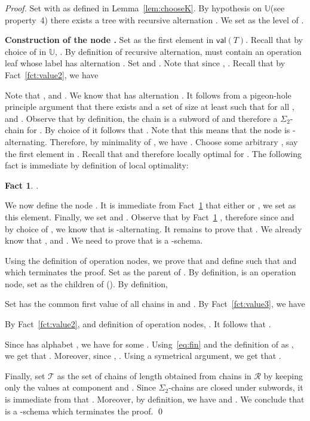 \documentclass[envcountsame]{llncs}
\newcommand\Ts{\ensuremath{\mathcal{T}}\xspace}
\newcommand\Rs{\ensuremath{\mathcal{R}}\xspace}
\newcommand\crr{\ensuremath{\mathbb{U}}\xspace}
\newcommand{\sic}[1]{\ensuremath{\Sigma_{#1}}\xspace}
\newcommand\val[1]{\ensuremath{\textsf{val}(#1)\xspace}}
\newcommand\chain{chain\xspace}
\newcommand\qchain[1]{\ensuremath{\sic{#1}}-chain\xspace}
\newcommand\chains{chains\xspace}
\newcommand\qchains[1]{\ensuremath{\sic{#1}}-chains\xspace}
\newcommand\dchain{\qchain{2}}
\newcommand\dchains{\qchains{2}}
\newtheorem{fact}[theorem]{Fact}
\begin{document}
\begin{proof}
  Set  with  as defined in
  Lemma~\ref{lem:chooseK}. By hypothesis on \crr (see property~4) there
  exists a tree   with recursive alternation . We set 
  as the level of .

  \medskip
  \noindent
  {\bf Construction of the node .} Set  as the first
  element in \val{T}. Recall that by choice of  in \crr, . 
  By definition of recursive alternation,  must contain an operation
  leaf  whose label  has alternation
  . Set  and . Note that since , . Recall that by Fact~\ref{fct:value2}, we have 
  
  Note that ,  and . We know that
   has alternation . It follows
  from a pigeon-hole principle argument that there exists  and a set  of size at least 
  such that for all ,  and . Observe
  that by definition, the \chain  is a subword of
   and therefore a \dchain for . By choice
  of  it follows that . Note
  that this means that the node  is
  -alternating. Therefore, by minimality of , we have .
  Choose some arbitrary , say the first element in . Recall
  that  and therefore locally optimal for
  . The following fact is immediate by definition of local
  optimality: 

  \begin{fact} \label{fct:ccont}
    .
  \end{fact}

  We now define the node . It is immediate from
  Fact~\ref{fct:ccont} that either  or
  , we set  as this element.
  Finally, we set  and . Observe that by
  Fact~\ref{fct:ccont} , therefore since
   and by choice of , we 
  know that  is -alternating. It remains to prove that
  . We already know that ,  and . We need to prove that
   is a -schema.

  \medskip

  Using the definition of operation nodes, we prove that 
  and define  such that  and  which terminates the
  proof. Set  as the parent of . By definition,  is an
  operation node, set  as the children of 
  (). By definition, 
  
  Set  has the common first value of all \chains in  and
  . By Fact~\ref{fct:value3}, we have   
  
  By Fact~\ref{fct:value2}, and definition of operation nodes, . It follows that .

  Since  has alphabet , we have 
  for some . Using~\eqref{eq:fin} and the definition of
   as , we get that . Moreover, since , .
  Using a symetrical argument, we get that .

  Finally, set \Ts as the set of \chains of length  obtained from
  \chains in \Rs by keeping only the values at component  and
  . Since \dchains are closed under subwords, it is immediate from
   that .
  Moreover, by definition, we have  and . We conclude that
   is a -schema  which terminates the proof. \qed
\end{proof}
\end{document}
